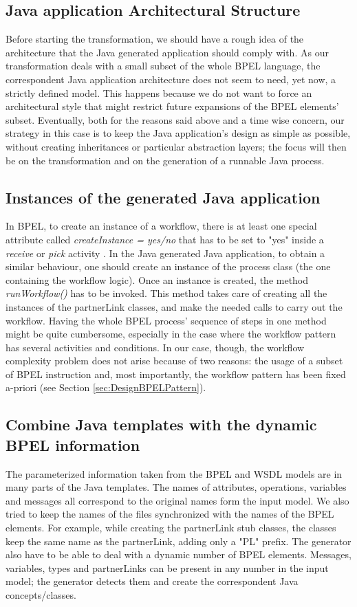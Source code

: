 \subsection{Java application Architectural Structure}
\label{sec:JavaArchitecStruct}
Before starting the transformation, we should have a rough idea of the architecture that the Java generated application should comply with.
As our transformation deals with a small subset of the whole BPEL language, the correspondent Java application architecture does not seem to need, yet now, a strictly defined model. This happens because we do not want to force an architectural style that might restrict future expansions of the BPEL elements' subset.
Eventually, both for the reasons said above and a time wise concern, our strategy in this case is to keep the Java application's design as simple as possible, without creating inheritances or particular abstraction layers; the focus will then be on the transformation and on the generation of a runnable Java process.

\subsection{Instances of the generated Java application}
\label{sec:JavaAppRunnable}
In BPEL, to create an instance of a workflow, there is at least one special attribute called \textit{createInstance = yes/no} that has to be set to "yes" inside a \textit{receive} or \textit{pick} activity \cite{BPEL-oasis}. In the Java generated Java application, to obtain a similar behaviour, one should create an instance of the process class (the one containing the workflow logic). Once an instance is created, the method \textit{runWorkflow()} has to be invoked. This method takes care of creating all the instances of the partnerLink classes, and make the needed calls to carry out the workflow.
Having the whole BPEL process' sequence of steps in one method might be quite cumbersome, especially in the case where the workflow pattern has several activities and conditions. In our case, though, the workflow complexity problem does not arise because of two reasons: the usage of a subset of BPEL instruction and, most importantly, the workflow pattern has been fixed a-priori (see Section \ref{sec:DesignBPELPattern}). 

\subsection{Combine Java templates with the dynamic BPEL information}
\label{TemplatesDynamicInfos}
The parameterized information taken from the BPEL and WSDL models are in many parts of the Java templates. The names of attributes, operations, variables and messages all correspond to the original names form the input model. 
We also tried to keep the names of the files synchronized with the names of the BPEL elements. For example, while creating the partnerLink stub classes, the classes keep the same name as the partnerLink, adding only a "PL" prefix. 
The generator also have to be able to deal with a dynamic number of BPEL elements. Messages, variables, types and  partnerLinks can be present in any number in the input model; the generator detects them and create the correspondent Java concepts/classes.

